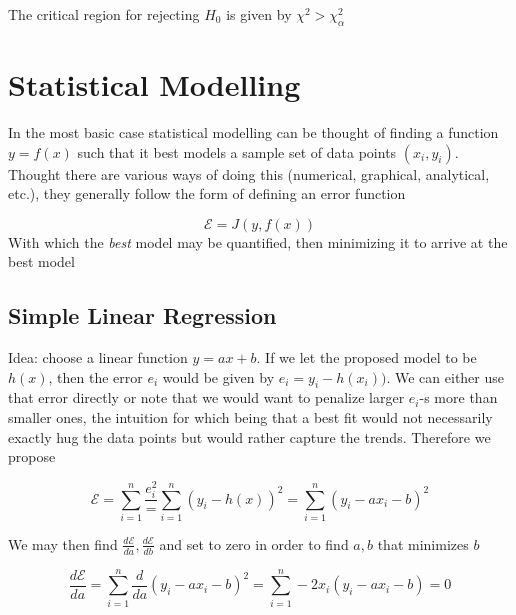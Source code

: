 \documentclass[10pt]{article}
\begin{document}
The critical region for rejecting $ H_0 $ is given by $ \chi^2 > \chi_\alpha^2 $  

\section{Statistical Modelling}

\begin{blockquote}
	In the most basic case statistical modelling can be thought of finding a function $ y = f(x) $ such that it best models a sample set of data points $ (x_i, y_i) $.
	Thought there are various ways of doing this (numerical, graphical, analytical, etc.), they generally follow the form of defining an error function

	\begin{equation}
		\mathcal{E} = J(y, f(x))
	\end{equation}
	With which the \textit{best} model may be quantified, then minimizing it to arrive at the best model
\end{blockquote}

\subsection{Simple Linear Regression}
Idea: choose a linear function $ y = ax + b $. If we let the proposed model to be $ h(x) $, then the error $ e_i $ would be given by $ e_i = y_i - h(x_i)) $.
We can either use that error directly or note that we would want to penalize larger $ e_i $-s more than smaller ones, the intuition for which being that a best fit would not necessarily exactly hug the data points but would rather capture the trends.
Therefore we propose

\begin{equation}
	\mathcal{E} = \sum_{i=1}^{n} \frac{e_i^2} = \sum^n_{i=1} (y_i - h(x))^2 = \sum^n_{i=1} (y_i - ax_i - b) ^2
\end{equation}


We may then find $ \frac{d\mathcal{E}}{da}, \frac{d\mathcal{E}}{db} $ and set to zero in order to find $ a, b $ that minimizes $ b $ 

\begin{equation}
	\frac{d\mathcal{E}}{da} = \sum^n_{i=1} \frac{d}{da} (y_i - ax_i - b)^2 = \sum^n_{i=1} -2x_i (y_i - ax_i - b) = 0
\end{equation}
\end{document}
